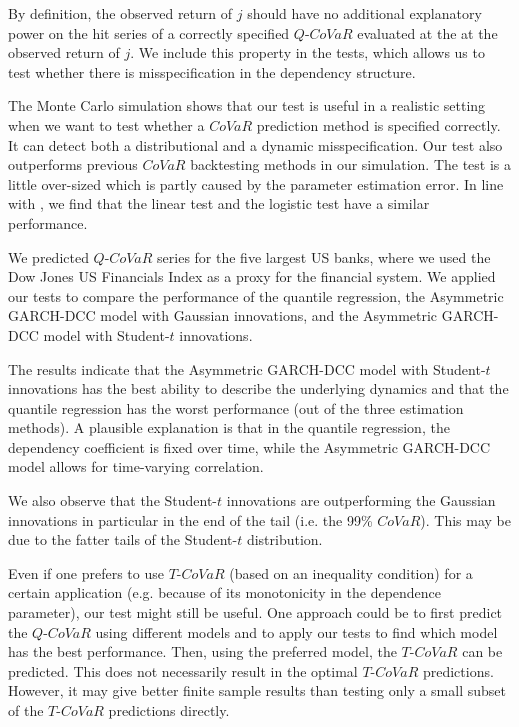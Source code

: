 \documentclass[12pt]{article}
\begin{document}
By definition, the observed return of $j$ should have no additional explanatory power on the hit series of a correctly specified $Q$-$CoVaR$ evaluated at the at the observed return of $j$. We include this property in the tests, which allows us to test whether there is misspecification in the dependency structure.

The Monte Carlo simulation shows that our test is useful in a realistic setting when we want to test whether a $CoVaR$ prediction method is specified correctly. It can detect both a distributional and a dynamic misspecification. Our test also outperforms previous $CoVaR$ backtesting methods in our simulation. The test is a little over-sized which is partly caused by the parameter estimation error. In line with \citet{nonlineartest}, we find that the linear test and the logistic test have a similar performance.

We predicted $Q$-$CoVaR$ series for the five largest US banks, where we used the Dow Jones US Financials Index as a proxy for the financial system.  We applied our tests to compare the performance of the quantile regression, the Asymmetric GARCH-DCC model with Gaussian innovations, and the Asymmetric GARCH-DCC model with Student-$t$ innovations.

The results indicate that the Asymmetric GARCH-DCC model with Student-$t$ innovations has the best ability to describe the underlying dynamics and that the quantile regression has the worst performance (out of the three estimation methods). A plausible explanation is that in the quantile regression, the dependency coefficient is fixed over time, while the Asymmetric GARCH-DCC model allows for time-varying correlation. 

We also observe that the Student-$t$ innovations are outperforming the Gaussian innovations in particular in the end of the tail (i.e. the 99\% $CoVaR$). This may be due to the fatter tails of the Student-$t$ distribution. 

Even if one prefers to use $T$-$CoVaR$ (based on an inequality condition) for a certain application (e.g. because of its monotonicity in the dependence parameter), our test might still be useful. One approach could be to first predict the $Q$-$CoVaR$ using different models and to apply our tests to find which model has the best performance. Then, using the preferred model, the $T$-$CoVaR$ can be predicted. This does not necessarily result in the optimal $T$-$CoVaR$ predictions. However, it may give better finite sample results than testing only a small subset of the $T$-$CoVaR$ predictions directly.
\end{document}
